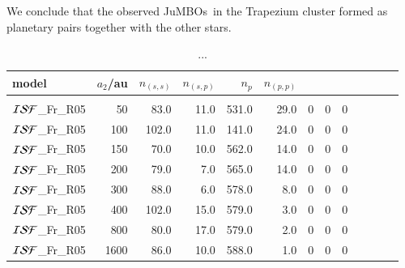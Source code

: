 \documentclass[aa]{lib/aa}
\newcommand{\jumbos}{\mbox{JuMBOs}}
\begin{document}
We conclude that the observed \jumbos\, in the Trapezium cluster
formed as planetary pairs together with the other stars.

\begin{table}
 \caption{...}
 \label{Tab:model_ISF_vs_sma_rates}
 \centering 
 \begin{tabular}{lrrrrrrrrrrrr}
   \hline\hline
   model & $a_2$/au & $n_{(s,s)}$ & $n_{(s,p)}$ & $n_{p}$ & $n_{(p,p)}$ \\
        \hline \vspace{-0.75em}\\
${\cal ISF}$\_Fr\_R05 &  50 &  83.0 & 11.0 & 531.0 & 29.0 & 0 & 0 & 0 \\
${\cal ISF}$\_Fr\_R05 & 100 & 102.0 & 11.0 & 141.0 & 24.0 & 0 & 0 & 0 \\
${\cal ISF}$\_Fr\_R05 & 150 &  70.0 & 10.0 & 562.0 & 14.0 & 0 & 0 & 0 \\
${\cal ISF}$\_Fr\_R05 & 200 &  79.0 &  7.0 & 565.0 & 14.0 & 0 & 0 & 0 \\
${\cal ISF}$\_Fr\_R05 & 300 &  88.0 &  6.0 & 578.0 & 8.0 & 0 & 0 & 0 \\
${\cal ISF}$\_Fr\_R05 & 400 & 102.0 & 15.0 & 579.0 & 3.0 & 0 & 0 & 0 \\
${\cal ISF}$\_Fr\_R05 & 800 &  80.0 & 17.0 & 579.0 & 2.0 & 0 & 0 & 0 \\
${\cal ISF}$\_Fr\_R05 &1600 &  86.0 & 10.0 & 588.0 & 1.0 & 0 & 0 & 0 \\
\end{tabular}
\end{table}
\end{document}
